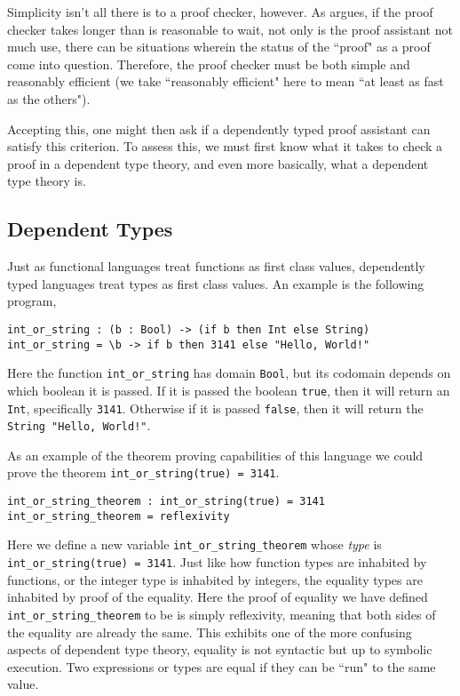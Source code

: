\documentclass[sigplan]{acmart}
\begin{document}
Simplicity isn't all there is to a proof checker, however.
As \citet{Geuvers2008} argues, if the proof checker takes longer than is reasonable to wait, not only is the proof assistant not much use, there can be situations wherein the status of the ``proof" as a proof come into question.
Therefore, the proof checker must be both simple and reasonably efficient (we take ``reasonably efficient" here to mean ``at least as fast as the others").

Accepting this, one might then ask if a dependently typed proof assistant can satisfy this criterion.
To assess this, we must first know what it takes to check a proof in a dependent type theory, and even more basically, what a dependent type theory is.

\subsection{Dependent Types}
\label{sec:dependent-types}

Just as functional languages treat functions as first class values, dependently typed languages treat types as first class values.
An example is the following program, 

\begin{verbatim}
int_or_string : (b : Bool) -> (if b then Int else String)
int_or_string = \b -> if b then 3141 else "Hello, World!"
\end{verbatim}

Here the function \verb|int_or_string| has domain \texttt{Bool}, but its codomain depends on which boolean it is passed.
If it is passed the boolean \texttt{true}, then it will return an \texttt{Int}, specifically \texttt{3141}.
Otherwise if it is passed \texttt{false}, then it will return the \texttt{String "Hello, World!"}.

As an example of the theorem proving capabilities of this language we could prove the theorem \verb|int_or_string(true) = 3141|.

\begin{verbatim}
int_or_string_theorem : int_or_string(true) = 3141
int_or_string_theorem = reflexivity
\end{verbatim}

Here we define a new variable \verb|int_or_string_theorem| whose \textit{type} is \\ \verb|int_or_string(true) = 3141|.
Just like how function types are inhabited by functions, or the integer type is inhabited by integers, the equality types are inhabited by proof of the equality.
Here the proof of equality we have defined \verb|int_or_string_theorem| to be is simply reflexivity, meaning that both sides of the equality are already the same.
This exhibits one of the more confusing aspects of dependent type theory, equality is not syntactic but up to symbolic execution.
Two expressions or types are equal if they can be ``run" to the same value.
\end{document}
